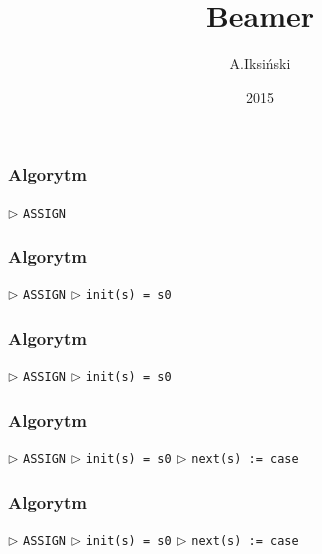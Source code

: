 \documentclass{beamer}
\title{Beamer}
\author[A.Iksiński]{A.Iksiński}
\institute{Wydział EAIiIB\\Katedra Informatyki Stosowanej}
\date[PL’06]{2015}
\begin{document}
\begin{frame}
\titlepage
\end{frame}
 
 
\begin{frame}[fragile, t]    %

\frametitle{Algorytm}
\begin{algorithmic}
\State $\triangleright$ \verb!ASSIGN! 
\end{algorithmic}
 
\end{frame}
 
\begin{frame}[fragile, t]    %

\frametitle{Algorytm}
\begin{algorithmic}
\State $\triangleright$ \verb!ASSIGN! 
\State $\triangleright$ \verb!init(s) = s0!

\end{algorithmic}
 
\end{frame}
 
\begin{frame}[fragile, t]    %

\frametitle{Algorytm}
\begin{algorithmic}
\State $\triangleright$ \verb!ASSIGN! 
\State $\triangleright$ \verb!init(s) = s0!

\end{algorithmic}
 
\end{frame}
 
\begin{frame}[fragile, t]    %

\frametitle{Algorytm}
\begin{algorithmic}
\State $\triangleright$ \verb!ASSIGN!
\State $\triangleright$ \verb!init(s) = s0!
\State $\triangleright$ \verb!next(s) := case!

\end{algorithmic}
 
\end{frame}
 
\begin{frame}[fragile, t]    %

\frametitle{Algorytm}
\begin{algorithmic}
\State $\triangleright$ \verb!ASSIGN!
\State $\triangleright$ \verb!init(s) = s0!
\State $\triangleright$ \verb!next(s) := case!

\end{algorithmic}
 
\end{frame}
 
\end{document}
